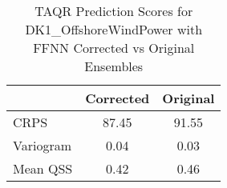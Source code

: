 
    \begin{table}[h!]
    \centering
    \begin{tabular}{|l|c|c|}
    \hline
    \textbf{} & \textbf{Corrected} & \textbf{Original} \\ \hline
    CRPS       & 87.45       & 91.55      \\ \hline
    Variogram  & 0.04  & 0.03 \\ \hline
    Mean QSS   & 0.42        & 0.46       \\ \hline
    \end{tabular}
    \caption{TAQR Prediction Scores for DK1_OffshoreWindPower with FFNN Corrected vs Original Ensembles}
    \label{tab:comparison}
    \end{table}
    